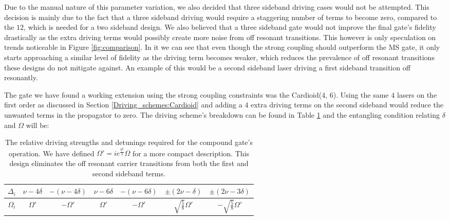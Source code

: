 \documentclass[12pt,twoside]{report}
\begin{document}
Due to the manual nature of this parameter variation, we also decided that three sideband driving cases would not be attempted. This decision is mainly due to the fact that a three sideband driving would require a staggering number of terms to become zero, compared to the $12$, which is needed for a two sideband design. We also believed that a three sideband gate would not improve the final gate's fidelity drastically as the extra driving terms would possibly create more noise from off resonant transitions. This however is only speculation on trends noticeable in Figure \ref{fig:comparison}. In it we can see that even though the strong coupling should outperform the MS gate, it only starts approaching a similar level of fidelity as the driving term becomes weaker, which reduces the prevalence of off resonant transitions these designs do not mitigate against. An example of this would be a second sideband laser driving a first sideband transition off resonantly.

The gate we have found a working extension using the strong coupling constraints was the Cardioid($4$, $6$). Using the same $4$ lasers on the first order as discussed in Section \ref{Driving_schemes:Cardioid} and adding a $4$ extra driving terms on the second sideband would reduce the unwanted terms in the propagator to zero. The driving scheme's breakdown can be found in Table \ref{tab:Compound} and the entangling condition relating $\delta$ and $\Omega$ will be:

\begin{table}[t!]
	\centering
	\begin{tabular}{c||cccc|cc}
		\hline
		$\Delta_i$ & $\nu - 4\delta$ & $-(\nu - 4\delta)$ & $\nu - 6\delta$ & $-(\nu - 6\delta)$ & $\pm(2\nu - \delta)$ & $\pm(2\nu - 3\delta)$ \\
		\hline
		$\Omega_i$ & $\Omega'$ & $-\Omega'$ & $\Omega'$ & $-\Omega'$ & $\sqrt{\frac{5}{8}}\Omega'$ & $-\sqrt{\frac{5}{8}}\Omega'$\\
		\hline
	\end{tabular}
	\caption{The relative driving strengths and detunings required for the compound gate's operation. We have defined $\Omega' = ie^{\frac{\eta^2}{2}}\Omega$ for a more compact description. This design eliminates the off resonant carrier transitions from both the first and second sideband terms.}
	\label{tab:Compound}
\end{table}
\end{document}
